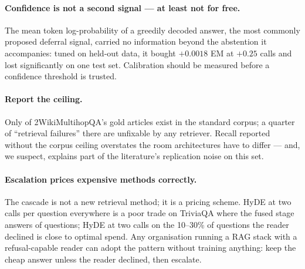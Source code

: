 \paragraph{Confidence is not a second signal --- at least not for free.}
The mean token log-probability of a greedily decoded answer, the most
commonly proposed deferral signal, carried no information beyond the
abstention it accompanies: tuned on held-out data, it bought $+0.0018$ EM
at $+0.25$ calls and lost significantly on one test set. Calibration
should be measured before a confidence threshold is trusted.

\paragraph{Report the ceiling.} Only \CoverageTwoWikiRecallCeiling{} of
2WikiMultihopQA's gold articles exist in the standard corpus; a quarter
of ``retrieval failures'' there are unfixable by any retriever. Recall
reported without the corpus ceiling overstates the room architectures
have to differ --- and, we suspect, explains part of the literature's
replication noise on this set.

\paragraph{Escalation prices expensive methods correctly.} The cascade is
not a new retrieval method; it is a pricing scheme. HyDE at two calls per
question everywhere is a poor trade on TriviaQA where the fused stage
answers \CascadeTriviaQAStageFused{} of \CascadeTriviaQAQuestions{}
questions; HyDE at two calls on the 10--30\% of questions the reader
declined is close to optimal spend. Any organisation running a RAG stack
with a refusal-capable reader can adopt the pattern without training
anything: keep the cheap answer unless the reader declined, then escalate.
